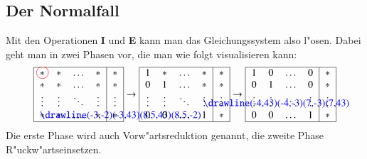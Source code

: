\subsection{Der Normalfall}
Mit den Operationen {\bf I} und {\bf E} kann man das Gleichungssystem
also l"osen.
Dabei geht man in zwei Phasen vor, die man wie folgt
visualisieren kann:
\begin{gather*}
\begin{tabular}{|>{$}c<{$}>{$}c<{$}>{$}c<{$}>{$}c<{$}|>{$}c<{$}|}
\hline
\begin{picture}(0,0)
\color{red}\put(2.7,3.1){\circle{12}}
\end{picture}%
*&*&\dots&*&*\\
*&*&\dots&*&*\\
\vdots& \vdots& \ddots& \vdots&\vdots\\
\begin{picture}(0,0)
\color{blue}\drawline(-3,-2)(-3,43)(8.5,43)(8.5,-2)
\end{picture}%
*&*&\dots&*&*\\
\hline
\end{tabular}
\rightarrow
\begin{tabular}{|>{$}c<{$}>{$}c<{$}>{$}c<{$}>{$}c<{$}|>{$}c<{$}|}
\hline
1&*&\dots&*&*\\
0&1&\dots&*&*\\
\vdots& \vdots& \ddots&\begin{picture}(0,0)
\color{blue}\drawline(-4,43)(-4,-3)(7,-3)(7,43)
\end{picture}%
\vdots&\vdots\\
0&0&\dots&1&*\\
\hline
\end{tabular}
\rightarrow
\begin{tabular}{|>{$}c<{$}>{$}c<{$}>{$}c<{$}>{$}c<{$}|>{$}c<{$}|}
\hline
1&0&\dots&0&*\\
0&1&\dots&0&*\\
\vdots& \vdots& \ddots& \vdots&\vdots\\
0&0&\dots&1&*\\
\hline
\end{tabular}
\end{gather*}
Die erste Phase wird auch Vorw"artsreduktion genannt, die
zweite Phase R"uckw"artseinsetzen.
